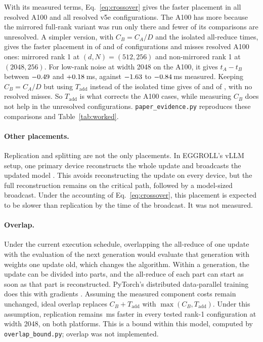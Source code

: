 With its measured terms, Eq.~\ref{eq:crossover} gives the faster placement in all
\ModelResolvedGPU{} resolved A100 and all \ModelResolvedTPU{} resolved v5e configurations. The
A100 has more because the mirrored full-rank variant was run only there and fewer of its
comparisons are unresolved. A simpler version, with $C_B=C_A/D$ and the isolated all-reduce
times, gives the faster placement in \IdealCorrectGPU{} of \TmConfigsGPU{} and
\IdealCorrectTPU{} of \TmConfigsTPU{} configurations and misses \IdealMissesGPU{} resolved A100
ones: mirrored rank 1 at $(d,N)=(512,256)$ and non-mirrored rank 1 at $(2048,256)$. For
low-rank noise at width 2048 on the A100, it gives $t_A-t_B$ between $-0.49$ and
$+0.18$\,ms, against $-1.63$ to $-0.84$\,ms
measured. Keeping $C_B=C_A/D$ but using $T_{\mathrm{add}}$ instead of the isolated time gives
\InContextCorrectGPU{} of \TmConfigsGPU{} and \InContextCorrectTPU{} of \TmConfigsTPU{}, with
no resolved misses. So $T_{\mathrm{add}}$ is what corrects the \IdealMissesGPU{} A100 cases,
while measuring $C_B$ does not help in the unresolved configurations.
\texttt{paper\_evidence.py} reproduces these comparisons and Table~\ref{tab:worked}.

\paragraph{Other placements.} Replication and splitting are not the only placements. In
EGGROLL's vLLM setup, one primary device reconstructs the whole update and broadcasts the
updated model \citep[Appendix L.2]{eggroll2025}. This avoids reconstructing the update on
every device, but the full reconstruction remains on the critical path, followed by a
model-sized broadcast. Under the accounting of Eq.~\ref{eq:crossover}, this placement is
expected to be slower than replication by the time of the broadcast. It was not measured.

\paragraph{Overlap.} Under the current execution schedule, overlapping the all-reduce of
one update with the evaluation of the next generation would evaluate that generation with
weights one update old, which changes the algorithm. Within a generation, the update can
be divided into parts, and the all-reduce of each part can start as soon as that part is
reconstructed. PyTorch's distributed data-parallel training does this with gradients
\citep{li2020ddp}. Assuming the measured component costs remain unchanged, ideal overlap
replaces $C_B+T_{\mathrm{add}}$ with $\max(C_B,T_{\mathrm{add}})$. Under this assumption,
replication remains \OverlapLead\,ms faster in every tested rank-1 configuration at width
2048, on both platforms. This is a bound within this model, computed by
\texttt{overlap\_bound.py}; overlap was not implemented.

